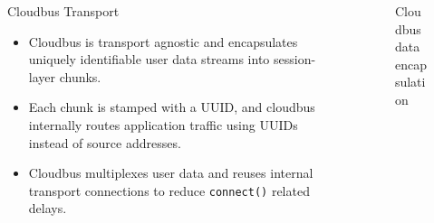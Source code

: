 \begin{frame}
{\begin{columns}
\begin{column}{0.5\textwidth}
\begin{block}{Cloudbus Transport}
					\begin{itemize}
						\item Cloudbus is transport agnostic and encapsulates uniquely identifiable user data streams into session-layer chunks.
						\item Each chunk is stamped with a UUID, and cloudbus internally routes application traffic using UUIDs instead of source addresses.
						\item Cloudbus multiplexes user data and reuses internal transport connections to reduce \texttt{connect()} related delays.
					\end{itemize}
					\normalsize
				\end{block}
			\end{column}
			\begin{column}{0.5\textwidth}
				\begin{figure}
					
					\caption{Cloudbus data encapsulation}
				\end{figure}
			\end{column}
		\end{columns}
	}
\end{frame}